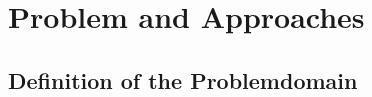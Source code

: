 
\chapter{Problem and Approaches}
\label{ch:ProblemApproaches}

\section{Definition of the Problemdomain}
